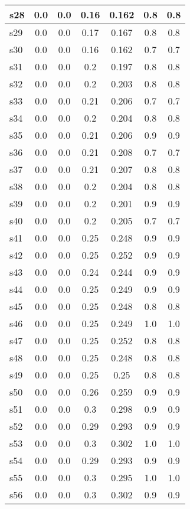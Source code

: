 \documentclass{article}
\begin{document}
\begin{tabular}{|l|c|c|c|c|c|c|}
\hline
s28 &0.0 & 0.0 & 0.16 & 0.162 & 0.8 & 0.8\\
\hline
s29 &0.0 & 0.0 & 0.17 & 0.167 & 0.8 & 0.8\\
\hline
s30 &0.0 & 0.0 & 0.16 & 0.162 & 0.7 & 0.7\\
\hline
s31 &0.0 & 0.0 & 0.2 & 0.197 & 0.8 & 0.8\\
\hline
s32 &0.0 & 0.0 & 0.2 & 0.203 & 0.8 & 0.8\\
\hline
s33 &0.0 & 0.0 & 0.21 & 0.206 & 0.7 & 0.7\\
\hline
s34 &0.0 & 0.0 & 0.2 & 0.204 & 0.8 & 0.8\\
\hline
s35 &0.0 & 0.0 & 0.21 & 0.206 & 0.9 & 0.9\\
\hline
s36 &0.0 & 0.0 & 0.21 & 0.208 & 0.7 & 0.7\\
\hline
s37 &0.0 & 0.0 & 0.21 & 0.207 & 0.8 & 0.8\\
\hline
s38 &0.0 & 0.0 & 0.2 & 0.204 & 0.8 & 0.8\\
\hline
s39 &0.0 & 0.0 & 0.2 & 0.201 & 0.9 & 0.9\\
\hline
s40 &0.0 & 0.0 & 0.2 & 0.205 & 0.7 & 0.7\\
\hline
s41 &0.0 & 0.0 & 0.25 & 0.248 & 0.9 & 0.9\\
\hline
s42 &0.0 & 0.0 & 0.25 & 0.252 & 0.9 & 0.9\\
\hline
s43 &0.0 & 0.0 & 0.24 & 0.244 & 0.9 & 0.9\\
\hline
s44 &0.0 & 0.0 & 0.25 & 0.249 & 0.9 & 0.9\\
\hline
s45 &0.0 & 0.0 & 0.25 & 0.248 & 0.8 & 0.8\\
\hline
s46 &0.0 & 0.0 & 0.25 & 0.249 & 1.0 & 1.0\\
\hline
s47 &0.0 & 0.0 & 0.25 & 0.252 & 0.8 & 0.8\\
\hline
s48 &0.0 & 0.0 & 0.25 & 0.248 & 0.8 & 0.8\\
\hline
s49 &0.0 & 0.0 & 0.25 & 0.25 & 0.8 & 0.8\\
\hline
s50 &0.0 & 0.0 & 0.26 & 0.259 & 0.9 & 0.9\\
\hline
s51 &0.0 & 0.0 & 0.3 & 0.298 & 0.9 & 0.9\\
\hline
s52 &0.0 & 0.0 & 0.29 & 0.293 & 0.9 & 0.9\\
\hline
s53 &0.0 & 0.0 & 0.3 & 0.302 & 1.0 & 1.0\\
\hline
s54 &0.0 & 0.0 & 0.29 & 0.293 & 0.9 & 0.9\\
\hline
s55 &0.0 & 0.0 & 0.3 & 0.295 & 1.0 & 1.0\\
\hline
s56 &0.0 & 0.0 & 0.3 & 0.302 & 0.9 & 0.9\\

\end{tabular}
\end{document}
